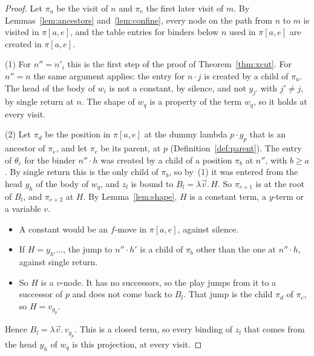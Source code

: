 \documentclass[11pt]{article}
\newcommand{\suc}[2]{#1{\cdot}#2}
\newcommand{\iv}[2]{\pi[#1,#2]}
\theoremstyle{plain}
\theoremstyle{definition}
\theoremstyle{remark}
\begin{document}
\begin{proof}
Let $\pi_a$ be the visit of $n$ and $\pi_e$ the first later visit of $m$.
By Lemmas~\ref{lem:ancestors} and~\ref{lem:confine}, every node on the
path from $n$ to $m$ is visited in $\iv ae$, and the table entries for
binders below $n$ used in $\iv ae$ are created in $\iv ae$.

(1) For $n''=n'_i$ this is the first step of the proof of
Theorem~\ref{thm:xcut}.  For $n''=n$ the same argument applies: the
entry for $\suc nj$ is created by a child of $\pi_a$.  The head of the
body of $w_i$ is not a constant, by silence, and not $y_{j'}$ with
$j'\ne j$, by single return at $n$.  The shape of $w_q$ is a property
of the term $w_q$, so it holds at every visit.

(2) Let $\pi_d$ be the position in $\iv ae$ at the dummy lambda
$\suc p{g_p}$ that is an ancestor of $\pi_e$, and let $\pi_c$ be its
parent, at $p$ (Definition~\ref{def:parent}).  The entry of $\theta_c$
for the binder $\suc{n''}h$ was created by a child of a position
$\pi_b$ at $n''$, with $b\ge a$.  By single return this is the only
child of $\pi_b$, so by~(1) it was entered from the head $y_h$ of the
body of $w_q$, and $z_l$ is bound to $B_l=\lambda\vec v.\,H$.  So
$\pi_{c+1}$ is at the root of $B_l$, and $\pi_{c+2}$ at $H$.  By
Lemma~\ref{lem:shape}, $H$ is a constant term, a $y$-term or a
variable $v$.
\begin{itemize}
\item A constant would be an $f$-move in $\iv ae$, against silence.
\item If $H=y_{h'}\dots$, the jump to $\suc{n''}{h'}$ is a child of
  $\pi_b$ other than the one at $\suc{n''}h$, against single return.
\item So $H$ is a $v$-node.  It has no successors, so the play jumps
  from it to a successor of $p$ and does not come back to $B_l$.  That
  jump is the child $\pi_d$ of $\pi_c$, so $H=v_{g_p}$.
\end{itemize}
Hence $B_l=\lambda\vec v.\,v_{g_p}$.  This is a closed term, so every
binding of $z_l$ that comes from the head $y_h$ of $w_q$ is this
projection, at every visit.
\end{proof}
\end{document}
